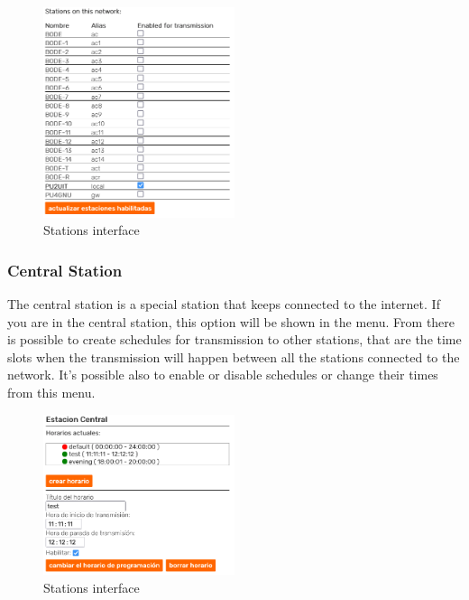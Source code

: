 \documentclass[11pt,a4paper]{article}
\begin{document}
\begin{figure}[H]
    \centering
    \includegraphics[width=0.5\textwidth]{screenshots/frontend/es/stations.png}
    \caption{Stations interface}
	\vspace{-10pt}
    \label{fig:stations}
\end{figure} 

\subsubsection{Central Station} 
\label{gui_central_station}

The central station is a special station that keeps connected to the internet. If you are in the central station, this option will be shown in the menu. From there is possible to create schedules for transmission to other stations, that are the time slots when the transmission will happen between all the stations connected to the network. It's possible also to enable or disable schedules or change their times from this menu.

\begin{figure}[H]
    \centering
    \includegraphics[width=0.5\textwidth]{screenshots/frontend/es/central.png}
    \caption{Stations interface}
	\vspace{-10pt}
    \label{fig:central}
\end{figure} 
    
\end{document}
